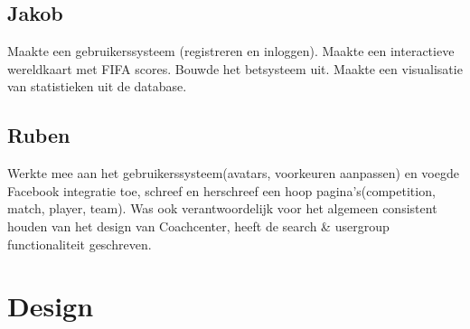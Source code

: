 \documentclass[11pt, a4paper]{article}
\begin{document}
\subsection{Jakob}
Maakte een gebruikerssysteem (registreren en inloggen). Maakte een interactieve wereldkaart met FIFA scores. Bouwde het betsysteem uit. Maakte een visualisatie van statistieken uit de database.
\subsection{Ruben}
Werkte mee aan het gebruikerssysteem(avatars, voorkeuren aanpassen) en voegde Facebook integratie toe, schreef en herschreef een hoop pagina's(competition, match, player, team). Was ook verantwoordelijk voor het algemeen consistent houden van het design van Coachcenter, heeft de search \& usergroup functionaliteit geschreven.

\section{Design}
\end{document}
